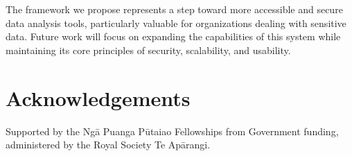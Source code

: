 \documentclass{article}
\begin{document}
The framework we propose represents a step toward more accessible and secure data analysis tools, particularly valuable for organizations dealing with sensitive data. Future work will focus on expanding the capabilities of this system while maintaining its core principles of security, scalability, and usability.

\section*{Acknowledgements}

Supported by the Ngā Puanga Pūtaiao Fellowships from Government funding, administered by the Royal Society Te Apārangi.

\printglossary[type=\acronymtype,nonumberlist,nopostdot]

\printbibliography
\end{document}
